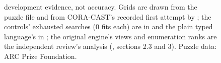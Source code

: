 \begin{figure}[t]
{development evidence, not accuracy. Grids are drawn from the puzzle file and from CORA-CAST's recorded first attempt by
\protect{}; the controls' exhausted searches (0 fits each)
are in \protect{} and the plain typed
language's in \protect{}; the original engine's views and
enumeration ranks are the independent review's analysis (\protect{},
sections 2.3 and 3). Puzzle data: ARC Prize Foundation.}
\label{fig:samefailure}
\end{figure}
